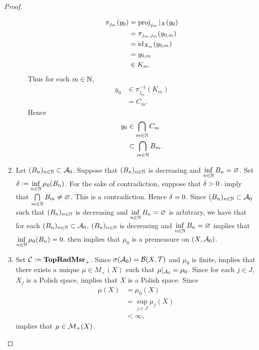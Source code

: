 \documentclass{book}
\begin{document}
\begin{proof}
\begin{enumerate}
\begin{enumerate}
\begin{align*}
				\pi_{j_m}(y_0)
				& = \operatorname{\text{proj}}_{j_m}|_{X}(y_0) \\
				& = \pi_{j_m, j_m}(y_{0,m}) \\
				& = \operatorname{id}_{X_m}(y_{0,m}) \\
				& = y_{0,m} \\
				& \in K_m.
			\end{align*}
			Thus for each $m \in \mathbb{N}$, 
			\begin{align*}
				y_0 
				& \in \pi_{j_m}^{-1}(K_m) \\
				& = C_m.
			\end{align*}
			Hence 
			\begin{align*}
				y_0
				& \in \bigcap\limits_{m \in \mathbb{N}} C_m \\
				& \subset  \bigcap\limits_{m \in \mathbb{N}} B_m.
			\end{align*}
		\end{enumerate} 
		\item Let $(B_n)_{n \in \mathbb{N}} \subset \mathcal{A}_0$. Suppose that $(B_n)_{n \in \mathbb{N}}$ is decreasing and $\inf\limits_{n \in \mathbb{N}} B_n = \varnothing$. Set $\delta \vcentcolon= \inf\limits_{n \in \mathbb{N}} \mu_0(B_n)$. For the sake of contradiction, suppose that $\delta > 0$.  imply that $\bigcap\limits_{m \in \mathbb{N}} B_m \neq \varnothing$. This is a contradiction. Hence $\delta = 0$. Since $(B_n)_{n \in \mathbb{N}} \subset \mathcal{A}_0$ such that $(B_n)_{n \in \mathbb{N}}$ is decreasing and $\inf\limits_{n \in \mathbb{N}} B_n = \varnothing$ is arbitrary, we have that for each $(B_n)_{n \in \mathbb{N}} \subset \mathcal{A}_0$, $(B_n)_{n \in \mathbb{N}}$ is decreasing and $\inf\limits_{n \in \mathbb{N}} B_n = \varnothing$ implies that $\inf\limits_{n \in \mathbb{N}} \mu_0(B_n) = 0$.  then implies that $\mu_0$ is a premeasure on $(X, \mathcal{A}_0)$. 
		\item Set $\mathcal{C} \vcentcolon= \operatorname*{\text{\textbf{TopRadMsr}}_{+}}$. Since $\sigma(\mathcal{A}_0) = \mathcal{B}(X, \mathcal{T})$ and $\mu_0$ is finite,  implies that there exists a unique $\mu \in M_+(X)$ such that $\mu|_{\mathcal{A}_0} = \mu_0$. Since for each $j \in J$, $X_j$ is a Polish space,  implies that $X$ is a Polish space. Since 
		\begin{align*}
			\mu(X)
			& = \mu_0(X) \\
			& = \sup\limits_{j \in J} \mu_j(X) \\
			& < \infty, 
		\end{align*}
		\rex{}  implies that $\mu \in \mathcal{M}_+(X)$.
		\begin{itemize}

\end{itemize}
\end{enumerate}
\end{proof}
\end{document}
